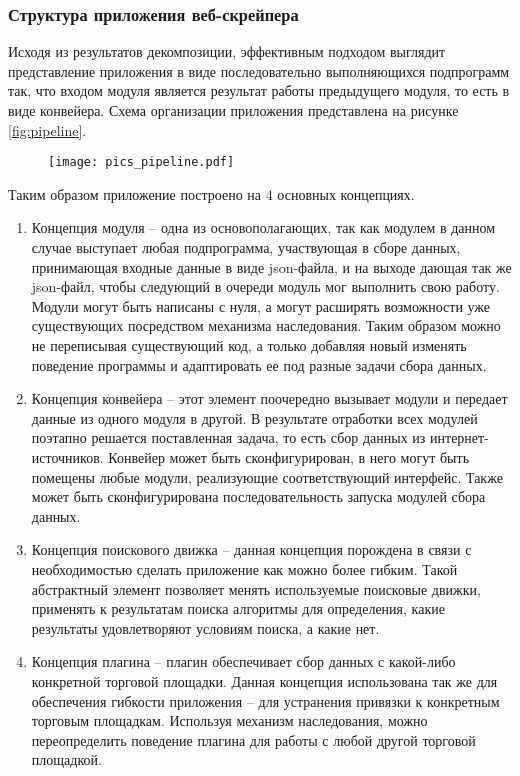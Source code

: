 \documentclass[../main]{subfiles}
\begin{document}
\subsubsection{Структура приложения веб-скрейпера}
Исходя из результатов декомпозиции, эффективным подходом выглядит представление приложения в виде последовательно выполняющихся подпрограмм так, что входом модуля является результат работы предыдуще\-го модуля, то есть в виде конвейера. Схема организации приложения представлена на рисунке \ref{fig:pipeline}.

\begin{figure}[H]
    \centering
    {\texttt{[image: pics\_pipeline.pdf]}}
    \vspace{-\baselineskip}
\end{figure}

Таким образом приложение построено на 4 основных концепциях.

\begin{enumerate}
    \item Концепция модуля -- одна из основополагающих, так как модулем в данном случае выступает любая подпрограмма, участвующая в сборе данных, принимающая входные данные в виде json-файла, и на выходе дающая так же json-файл, чтобы следующий в очереди модуль мог выполнить свою работу. Модули могут быть написаны с нуля, а могут расширять возможности уже существующих посредством механизма наследования. Таким образом можно не переписывая существующий код, а только добавляя новый изменять поведение программы и адаптировать ее под разные задачи сбора данных.
    \item Концепция конвейера -- этот элемент поочередно вызывает модули и передает данные из одного модуля в другой. В результате отработки всех модулей поэтапно решается поставленная задача, то есть сбор данных из интернет-источников. Конвейер может быть сконфигурирован, в него могут быть помещены любые модули, реализующие соответствующий интерфейс. Также может быть сконфигурирована последовательность запуска модулей сбора данных.
    \item Концепция поискового движка -- данная концепция порождена в связи с необходимостью сделать приложение как можно более гибким. Такой абстрактный элемент позволяет менять используемые поисковые движки, применять к результатам поиска алгоритмы для определения, какие результаты удовлетворяют условиям поиска, а какие нет.
    \item Концепция плагина -- плагин обеспечивает сбор данных с какой-либо конкретной торговой площадки. Данная концепция использована так же для обеспечения гибкости приложения -- для устранения привязки к конкретным торговым площадкам. Используя механизм наследования, можно переопределить поведение плагина для работы с любой другой торговой площадкой. 
\end{enumerate}
\end{document}
